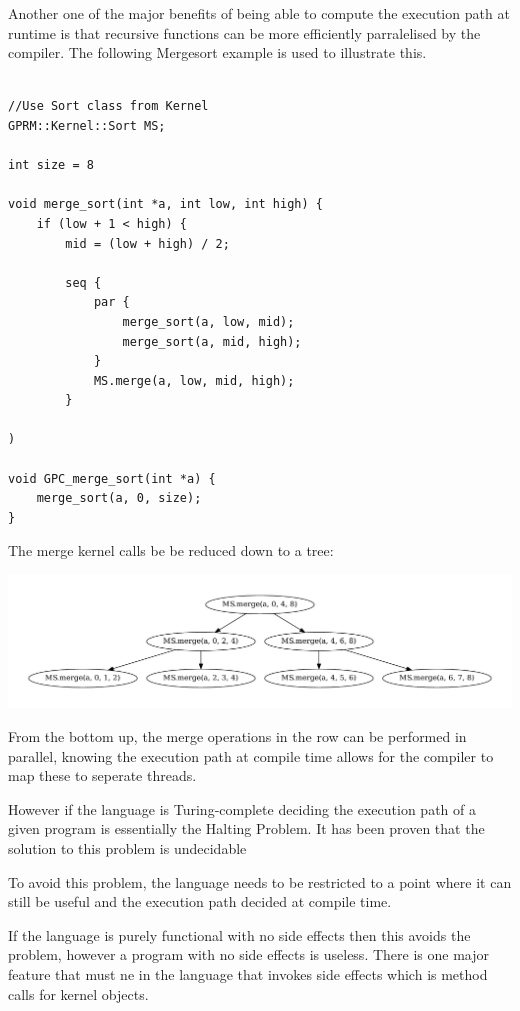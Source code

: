 Another one of the major benefits of being able to compute the execution
path at runtime is that recursive functions can be more efficiently parralelised
by the compiler. The following Mergesort example is used to illustrate this.

\begin{lstlisting}[style=myGPC]

//Use Sort class from Kernel
GPRM::Kernel::Sort MS;

int size = 8

void merge_sort(int *a, int low, int high) {
    if (low + 1 < high) {
        mid = (low + high) / 2;
   
        seq {
            par {
                merge_sort(a, low, mid);
                merge_sort(a, mid, high);
            }
            MS.merge(a, low, mid, high);            
        }
    
)

void GPC_merge_sort(int *a) {
    merge_sort(a, 0, size);
}

\end{lstlisting}

The merge kernel calls be be reduced down to a tree:

\begin{center}
\includegraphics[scale=0.5]{graphs/mergesortTree.pdf}
\end{center}


From the bottom up, the merge operations in the row can be performed in
parallel, knowing the execution path at compile time allows for the compiler
to map these to seperate threads. 


However if the language is Turing-complete deciding the execution path
of a given program is essentially the Halting Problem. It has been proven that the solution to this problem is undecidable\cite{halting} 

To avoid this problem, the language needs to be restricted to a point where it can still be useful and the execution
path decided at compile time.

If the language is purely functional with no side effects then this avoids the problem, however a program
with no side effects is useless. There is one major feature that must ne in the language that invokes
side effects which is method calls for kernel objects. 


